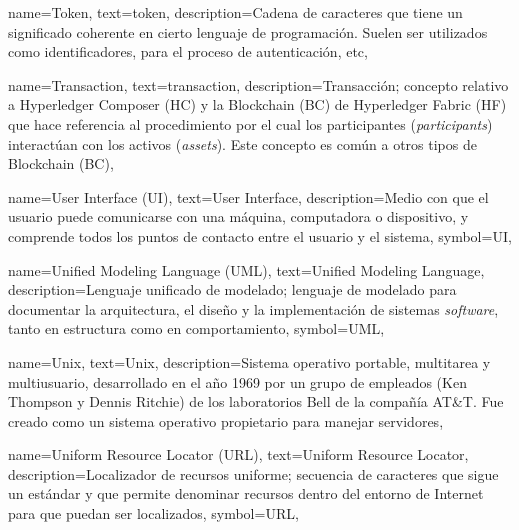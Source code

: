 {
    name={Token},
    text={token},
    description={Cadena de caracteres que tiene un significado coherente en cierto lenguaje de programación. Suelen ser utilizados como identificadores, para el proceso de autenticación, etc},
}

{
    name={Transaction},
    text={transaction},
    description={Transacción; concepto relativo a Hyperledger Composer (HC) y la Blockchain (BC) de Hyperledger Fabric (HF) que hace referencia al procedimiento por el cual los participantes (\textit{participants}) interactúan con los activos (\textit{assets}). Este concepto es común a otros tipos de Blockchain (BC)},
}

{
    name={User Interface (UI)},
    text={User Interface},
    description={Medio con que el usuario puede comunicarse con una máquina, computadora o dispositivo, y comprende todos los puntos de contacto entre el usuario y el sistema},
    symbol={UI},
}

{
    name={Unified Modeling Language (UML)},
    text={Unified Modeling Language},
    description={Lenguaje unificado de modelado; lenguaje de modelado para documentar la arquitectura, el diseño y la implementación de sistemas \textit{software}, tanto en estructura como en comportamiento},
    symbol={UML},
}

{
    name={Unix},
    text={Unix},
    description={Sistema operativo portable, multitarea y multiusuario, desarrollado en el año 1969 por un grupo de empleados (Ken Thompson y Dennis Ritchie) de los laboratorios Bell de la compañía AT\&T. Fue creado como un sistema operativo propietario para manejar servidores},
}

{
    name={Uniform Resource Locator (URL)},
    text={Uniform Resource Locator},
    description={Localizador de recursos uniforme; secuencia de caracteres que sigue un estándar y que permite denominar recursos dentro del entorno de Internet para que puedan ser localizados},
    symbol={URL},
}

